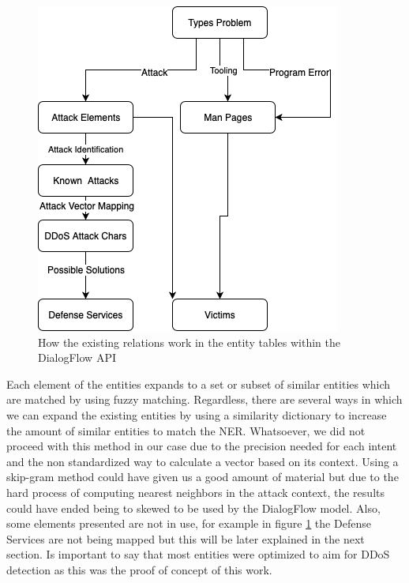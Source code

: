 \begin{figure}[!ht]
    \centering
    \includegraphics[scale=0.80]{MA-BA-Thesis/EntityRelation.png}
    \caption{How the existing relations work in the entity tables within the DialogFlow API}
    \label{fig:EntityRelation}
\end{figure}


Each element of the entities expands to a set or subset of similar entities which are matched by using fuzzy matching. Regardless, there are several ways in which we can expand the existing entities by using a similarity dictionary to increase the amount of similar entities to match the NER. Whatsoever, we did not proceed with this method in our case due to the precision needed for each intent and the non standardized way to calculate a vector based on its context. Using a skip-gram method could have given us a good amount of material but due to the hard process of computing nearest neighbors in the attack context, the results could have ended being to skewed to be used by the DialogFlow model. Also, some elements presented are not in use, for example in figure \ref{fig:EntityRelation} the Defense Services are not being mapped but this will be later explained in the next section. Is important to say that most entities were optimized to aim for DDoS detection as this was the proof of concept of this work.

